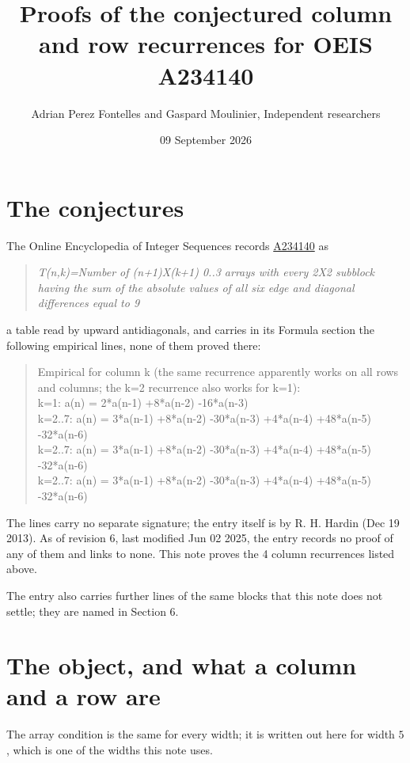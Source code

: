 \documentclass[11pt]{article}
\title{Proofs of the conjectured column and row recurrences for OEIS A234140}
\author{Adrian Perez Fontelles and Gaspard Moulinier, Independent researchers}
\date{09 September 2026}
\theoremstyle{definition}
\begin{document}
\maketitle
\section{The conjectures}

The Online Encyclopedia of Integer Sequences records \href{https://oeis.org/A234140}{A234140} as

\begin{quote}\itshape T(n,k)=Number of (n+1)X(k+1) 0..3 arrays with every 2X2 subblock having the sum of the absolute values of all six edge and diagonal differences equal to 9\end{quote}

a table read by upward antidiagonals, and carries in its Formula section the following empirical lines, none of them proved there:

\begin{quote}\ttfamily Empirical for column k (the same recurrence apparently works on all rows and columns; the k=2 recurrence also works for k=1):\\
k=1: a(n) = 2*a(n-1) +8*a(n-2) -16*a(n-3)\\k=2..7: a(n) = 3*a(n-1) +8*a(n-2) -30*a(n-3) +4*a(n-4) +48*a(n-5) -32*a(n-6)\\k=2..7: a(n) = 3*a(n-1) +8*a(n-2) -30*a(n-3) +4*a(n-4) +48*a(n-5) -32*a(n-6)\\k=2..7: a(n) = 3*a(n-1) +8*a(n-2) -30*a(n-3) +4*a(n-4) +48*a(n-5) -32*a(n-6)\end{quote}

The lines carry no separate signature; the entry itself is by R. H. Hardin (Dec 19 2013). As of revision 6, last modified Jun 02 2025, the entry records no proof of any of them and links to none. This note proves the 4 column recurrences listed above.

The entry also carries further lines of the same blocks that this note does not settle; they are named in Section 6.

\section{The object, and what a column and a row are}

The array condition is the same for every width; it is written out here for width $5$, which is one of the widths this note uses.
\end{document}
